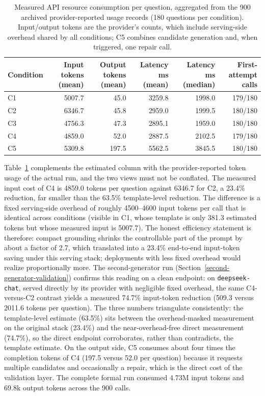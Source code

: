 \documentclass{article}
\begin{document}
\begin{table}[H]

\caption{Measured API resource consumption per question, aggregated from the 900 archived provider-reported usage records (180 questions per condition). Input/output tokens are the provider's counts, which include serving-side overhead shared by all conditions; C5 combines candidate generation and, when triggered, one repair call.}
\label{tab:real-tokens}
\centering

\begin{tabular}{lrrrrr}
\toprule
\textbf{Condition} & \textbf{Input tokens (mean)} & \textbf{Output tokens (mean)} & \textbf{Latency ms (mean)} & \textbf{Latency ms (median)} & \textbf{First-attempt calls} \\
\midrule
C1 & 5007.7 & 45.0 & 3259.8 & 1998.0 & 179/180 \\
C2 & 6346.7 & 45.8 & 2959.0 & 1999.5 & 180/180 \\
C3 & 4756.3 & 47.3 & 2895.1 & 1959.0 & 180/180 \\
C4 & 4859.0 & 52.0 & 2887.5 & 2102.5 & 179/180 \\
C5 & 5309.8 & 197.5 & 5562.5 & 3845.5 & 180/180 \\
\bottomrule
\end{tabular}

\end{table}

Table~\ref{tab:real-tokens} complements the estimated column with the provider-reported token usage of the actual run, and the two views must not be conflated. The measured input cost of C4 is 4859.0 tokens per question against 6346.7 for C2, a 23.4\% reduction, far smaller than the 63.5\% template-level reduction. The difference is a fixed serving-side overhead of roughly 4500--4600 input tokens per call that is identical across conditions (visible in C1, whose template is only 381.3 estimated tokens but whose measured input is 5007.7). The honest efficiency statement is therefore: compact grounding shrinks the controllable part of the prompt by about a factor of 2.7, which translated into a 23.4\% end-to-end input-token saving under this serving stack; deployments with less fixed overhead would realize proportionally more. The second-generator run (Section~\ref{second-generator-validation}) confirms this reading on a clean endpoint: on \texttt{deepseek-chat}, served directly by its provider with negligible fixed overhead, the same C4-versus-C2 contrast yields a measured 74.7\% input-token reduction (509.3 versus 2011.6 tokens per question). The three numbers triangulate consistently: the template-level estimate (63.5\%) sits between the overhead-masked measurement on the original stack (23.4\%) and the near-overhead-free direct measurement (74.7\%), so the direct endpoint corroborates, rather than contradicts, the template estimate. On the output side, C5 consumes about four times the completion tokens of C4 (197.5 versus 52.0 per question) because it requests multiple candidates and occasionally a repair, which is the direct cost of the validation layer. The complete formal run consumed 4.73M input tokens and 69.8k output tokens across the 900 calls.
\end{document}
